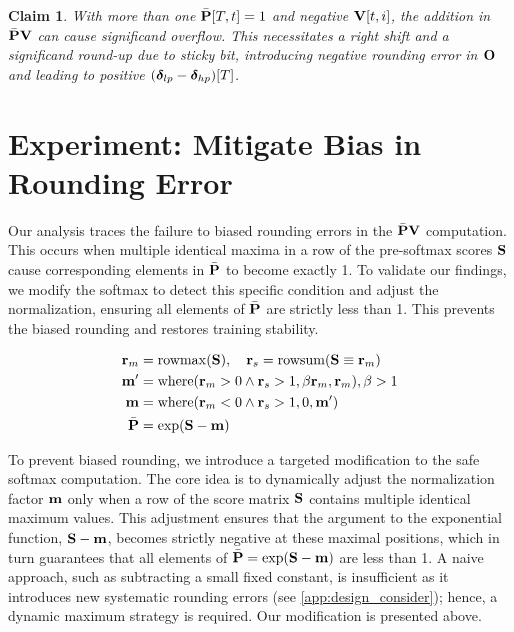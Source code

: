 \documentclass{article} %
\newtheorem{claim}{Claim}
\begin{document}
\begin{tcolorbox}[
  colback=cyan!5!white,      
  colframe=black!100,
  boxrule=0.4pt,
  arc=3pt,
  left=5pt, right=5pt,
  top=5pt, bottom=5pt,
  width=0.95\linewidth,
  coltitle=black,
  center
]
\begin{claim}\label{claim3}
  With more than one $\bar{{\mathbf{P}}}[T,t]=1$ and negative ${\mathbf{V}}[t, i]$, the addition in $\bar{{\mathbf{P}}}{\mathbf{V}}$ can cause significand overflow. This necessitates a right shift and a significand round-up due to sticky bit, introducing negative rounding error in ${\mathbf{O}}$ and leading to positive $({\boldsymbol{\delta}}_{lp} - {\boldsymbol{\delta}}_{hp})[T]$.
\end{claim}
\end{tcolorbox}




\section{Experiment: Mitigate Bias in Rounding Error}\label{sec:stable_fa}


Our analysis traces the failure to biased rounding errors in the $\bar{{\mathbf{P}}}{\mathbf{V}}$ computation. This occurs when multiple identical maxima in a row of the pre-softmax scores ${\mathbf{S}}$ cause corresponding elements in $\bar{{\mathbf{P}}}$ to become exactly 1. To validate our findings, we modify the softmax to detect this specific condition and adjust the normalization, ensuring all elements of $\bar{{\mathbf{P}}}$ are strictly less than 1. This prevents the biased rounding and restores training stability.

\begin{figure}
\begin{align*}
{\mathbf{r}}_m &= \mathrm{rowmax}({\mathbf{S}}), \quad {\mathbf{r}}_s = \mathrm{rowsum}({\mathbf{S}} \equiv {\mathbf{r}}_m) \\
{\mathbf{m}}^\prime &= \mathrm{where}({\mathbf{r}}_m > 0 \land {\mathbf{r}}_s > 1, \beta {\mathbf{r}}_m, {\mathbf{r}}_m), \beta > 1 \\
{\mathbf{m}} &= \mathrm{where}({\mathbf{r}}_m < 0 \land {\mathbf{r}}_s > 1, 0, {\mathbf{m}}^\prime) \\
\bar{{\mathbf{P}}} &= \exp({\mathbf{S}} - {\mathbf{m}})
\end{align*}
\vspace{-25px}
\end{figure}
To prevent biased rounding, we introduce a targeted modification to the safe softmax computation. The core idea is to dynamically adjust the normalization factor ${\mathbf{m}}$ only when a row of the score matrix ${\mathbf{S}}$ contains multiple identical maximum values. This adjustment ensures that the argument to the exponential function, ${\mathbf{S}} - {\mathbf{m}}$, becomes strictly negative at these maximal positions, which in turn guarantees that all elements of $\bar{{\mathbf{P}}} = \exp({\mathbf{S}} - {\mathbf{m}})$ are less than 1. A naive approach, such as subtracting a small fixed constant, is insufficient as it introduces new systematic rounding errors (see \cref{app:design_consider}); hence, a dynamic maximum strategy is required. Our modification is presented above.
\end{document}
